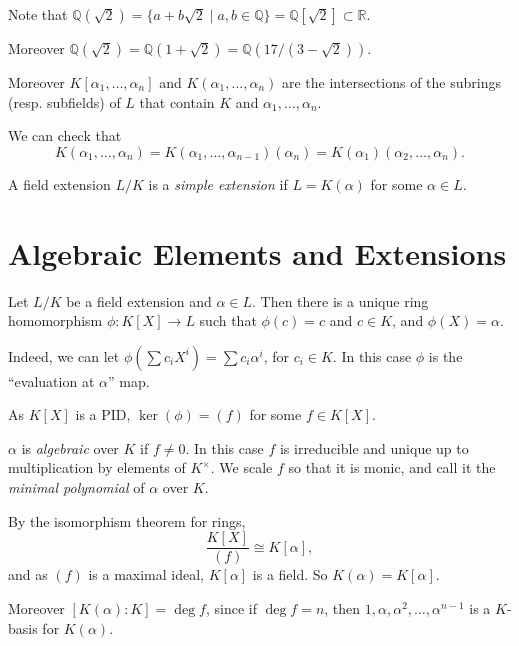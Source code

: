 \documentclass[12pt]{article}
\begin{document}
\begin{exbox}
	Note that $\mathbb{Q}(\sqrt 2) = \{a + b\sqrt 2 \mid a, b \in \mathbb{Q}\} = \mathbb{Q}[\sqrt 2] \subset \mathbb{R}$.

	Moreover $\mathbb{Q}(\sqrt 2) = \mathbb{Q}(1 + \sqrt 2) = \mathbb{Q}(17/(3 - \sqrt 2))$.
\end{exbox}

Moreover $K[\alpha_1, \ldots, \alpha_n]$ and $K(\alpha_1, \ldots, \alpha_n)$ are the intersections of the subrings (resp. subfields) of $L$ that contain $K$ and $\alpha_1, \ldots, \alpha_n$.

We can check that
\[
K(\alpha_1, \ldots, \alpha_n) = K(\alpha_1, \ldots, \alpha_{n-1})(\alpha_n) = K(\alpha_1)(\alpha_2,\ldots,\alpha_n).
\]

\begin{definition}
	A field extension $L/K$ is a \emph{simple extension} if $L = K(\alpha)$ for some $\alpha \in L$.
\end{definition}

\newpage

\section{Algebraic Elements and Extensions}%
\label{sec:algebraic_elements_and_extensions}

Let $L/K$ be a field extension and $\alpha \in L$. Then there is a unique ring homomorphism $\phi : K[X] \to L$ such that $\phi(c) = c$ and $c \in K$, and $\phi(X) = \alpha$.

Indeed, we can let $\phi(\sum c_i X^{i}) = \sum c_i \alpha^{i}$, for $c_i \in K$. In this case $\phi$ is the ``evaluation at $\alpha$'' map.

As $K[X]$ is a PID, $\ker(\phi) = (f)$ for some $f \in K[X]$.

\begin{definition}
	$\alpha$ is \emph{algebraic} over $K$ if $f \neq 0$. In this case $f$ is irreducible and unique up to multiplication by elements of $K^{\times}$. We scale $f$ so that it is monic, and call it the \emph{minimal polynomial} of $\alpha$ over $K$.
\end{definition}

By the isomorphism theorem for rings,
\[
	\frac{K[X]}{(f)} \cong K[\alpha],
\]
and as $(f)$ is a maximal ideal, $K[\alpha]$ is a field. So $K(\alpha) = K[\alpha]$.

Moreover $[K(\alpha):K] = \deg f$, since if $\deg f = n$, then $1, \alpha, \alpha^2, \ldots, \alpha^{n-1}$ is a $K$-basis for $K(\alpha)$.
\end{document}
